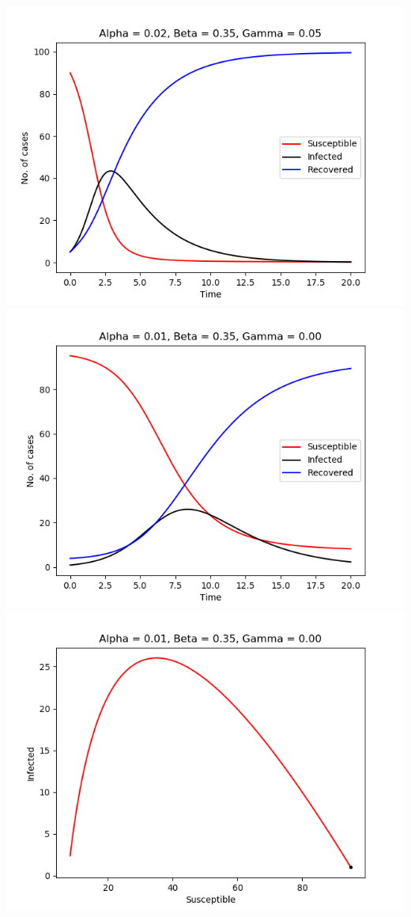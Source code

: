 \includegraphics[scale=0.4]{fig/img/t_a2_b35_g5.png}\\
\includegraphics[scale=0.4]{fig/img/t_x1_1_x2_95.png}
\includegraphics[scale=0.4]{fig/img/x1_1_x2_95.png}\\